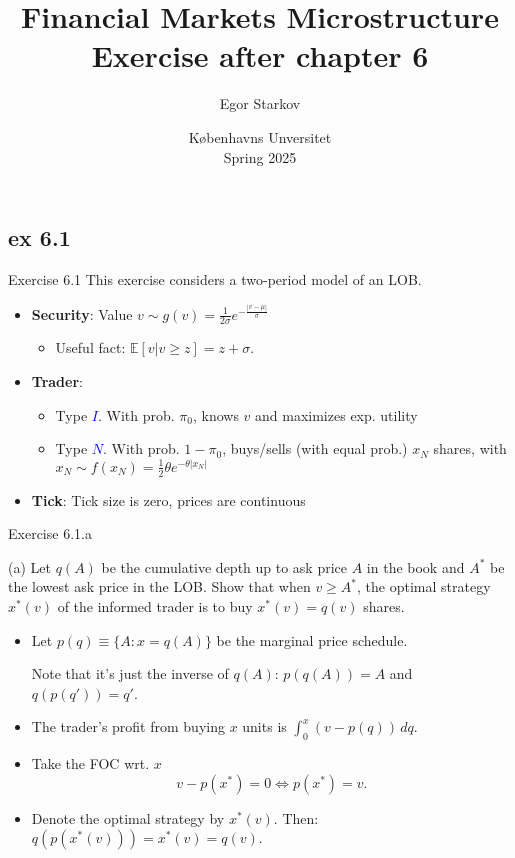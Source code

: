 \documentclass[english,10pt
,aspectratio=169
]{beamer}
\title{Financial Markets Microstructure \\ Exercise after chapter 6}
\author{Egor Starkov}
\date{K{\o}benhavns Unversitet \\
	Spring 2025}
\begin{document}
\subsection{ex 6.1}

\begin{frame}[label=ex1]{Exercise 6.1}
	This exercise considers a two-period model of an LOB.
	\begin{itemize}
		\item \textbf{Security}: Value $v \sim g(v)=\frac{1}{2\sigma} e^{-\frac{|v-\mu|}{\sigma}}$
		\begin{itemize}
			\item Useful fact: $\mathbb{E}[v|v \ge z]=z+\sigma$.
		\end{itemize}
		\item \textbf{Trader}: 
		\begin{itemize}
			\item Type \textcolor{blue}{$I$}. With prob. $\pi_0$, knows $v$ and maximizes exp. utility
			\item Type \textcolor{blue}{$N$}. With prob. $1-\pi_0$, buys/sells (with equal prob.) $x_N$ shares, with $x_N \sim f(x_N)=\frac{1}{2}\theta e^{-\theta |x_N|}$ 
		\end{itemize}
		\item \textbf{Tick}: Tick size is zero, prices are continuous
	\end{itemize}
\end{frame}


\begin{frame}{Exercise 6.1.a}
	\begin{exampleblock}{}
		(a) Let $q(A)$ be the cumulative depth up to ask price $A$ in the book and $A^*$ be the lowest ask price in the LOB. Show that when $v \ge A^*$, the optimal strategy $x^*(v)$ of the informed trader is to buy $x^*(v)=q(v)$ shares.
	\end{exampleblock}

	\pause

	\begin{itemize}
		\item Let $p(q) \equiv \{A: x=q(A)\}$ be the marginal price schedule.
		
		Note that it's just the inverse of $q(A)$: $p(q(A)) = A$ and $q(p(q'))=q'$.
		\item The trader's profit from buying $x$ units is $\int_0^x (v-p(q)) \, dq.$
		\item Take the FOC wrt. $x$
		\[
		v-p(x^*)=0 \Leftrightarrow p(x^*)=v.
		\]
		\item Denote the optimal strategy by $x^*(v)$. Then:
		$q(p(x^*(v)))=x^*(v)=q(v)$.
	\end{itemize}
\end{frame}
\end{document}
